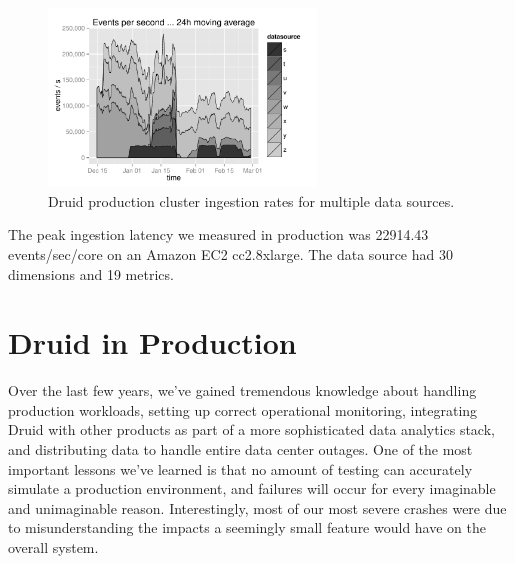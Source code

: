 \documentclass{acm_proc_article-sp}
\begin{document}
\begin{figure}
\centering
\includegraphics[width = 2.8in]{ingestion_rate}
\caption{Druid production cluster ingestion rates for multiple data sources.}
\label{fig:ingestion_rate}
\end{figure}

The peak ingestion latency we measured in production was 22914.43 events/sec/core
on an Amazon EC2 cc2.8xlarge. The data source had 30 dimensions and 19 metrics.

\section{Druid in Production}
\label{sec:production}
Over the last few years, we've gained tremendous
knowledge about handling production workloads, setting up correct operational
monitoring, integrating Druid with other products as part of a more
sophisticated data analytics stack, and distributing data to handle entire data
center outages. One of the most important lessons we've learned is that no
amount of testing can accurately simulate a production environment, and failures
will occur for every imaginable and unimaginable reason. Interestingly, most of
our most severe crashes were due to misunderstanding the impacts a
seemingly small feature would have on the overall system. 
\end{document}
